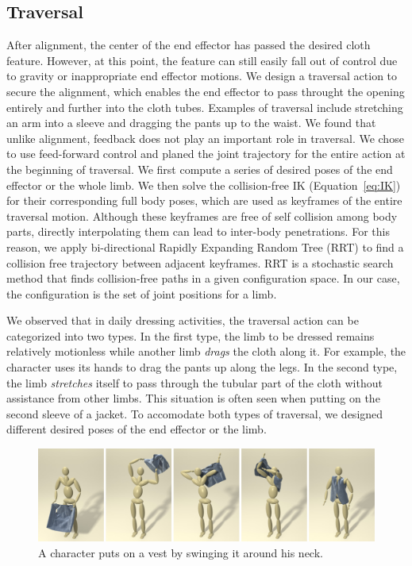 \subsection{Traversal}
After alignment, the center of the end effector has passed the desired cloth feature. However, at this point, the feature can still easily fall out of control due to gravity or inappropriate end effector motions. We design a traversal action to secure the alignment, which enables the end effector to pass throught the opening entirely and further into the cloth tubes. Examples of traversal include stretching an arm into a sleeve and dragging the pants up to the waist. We found that unlike alignment, feedback does not play an important role in traversal. We chose to use feed-forward control and planed the joint trajectory for the entire action at the beginning of traversal. We first compute a series of desired poses of the end effector or the whole limb. We then solve the collision-free IK (Equation~\ref{eq:IK}) for their corresponding full body poses, which are used as keyframes of the entire traversal motion. Although these keyframes are free of self collision among body parts, directly interpolating them can lead to inter-body penetrations. For this reason, we apply bi-directional Rapidly Expanding Random Tree (RRT) \cite{} to find a collision free trajectory between adjacent keyframes. RRT is a stochastic search method that finds collision-free paths in a given configuration space. In our case, the configuration is the set of joint positions for a limb.

We observed that in daily dressing activities, the traversal action can be categorized into two types. In the first type, the limb to be dressed remains relatively motionless while another limb \emph{drags} the cloth along it. For example, the character uses its hands to drag the pants up along the legs. In the second type, the limb \emph{stretches} itself to pass through the tubular part of the cloth without assistance from other limbs. This situation is often seen when putting on the second sleeve of a jacket. To accomodate both types of traversal, we designed different desired poses of the end effector or the limb.


\begin{figure}[!t]
  \centering
  \includegraphics[width=\textwidth]{images/vest}
  \caption{A character puts on a vest by swinging it around his neck.}
  \label{fig:vest}
\end{figure}

